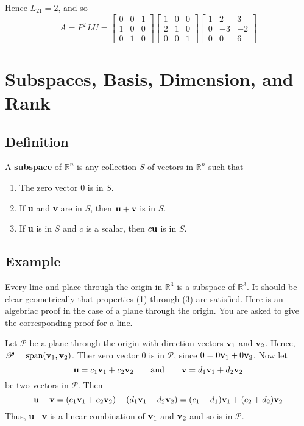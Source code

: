 Hence $L_{21}=2$, and so
\[
    A=P^TLU=\begin{bmatrix}
        0 & 0 & 1 \\
        1 & 0 & 0 \\
        0 & 1 & 0
    \end{bmatrix}\begin{bmatrix}
        1 & 0 & 0 \\
        2 & 1 & 0 \\
        0 & 0 & 1
    \end{bmatrix}\begin{bmatrix}
        1 & 2  & 3  \\
        0 & -3 & -2 \\
        0 & 0  & 6
    \end{bmatrix}
\]

\section{Subspaces, Basis, Dimension, and Rank}

\subsection*{Definition}
A \textbf{subspace} of $\mathbb{R}^n$ is any collection $S$ of vectors in
$\mathbb{R}^n$ such that
\begin{enumerate}[1.]
    \item The zero vector 0 is in $S$.
    \item If \textbf{u} and \textbf{v} are in $S$, then $\mathbf{u+v}$ is in $S$.
    \item If \textbf{u} is in $S$ and $c$ is a scalar, then $c\mathbf{u}$ is in $S$.
\end{enumerate}

\subsection*{Example}
Every line and place through the origin in $\mathbb{R}^3$ is a subspace of $\mathbb{R}^3$.
It should be clear geometrically that properties (1) through (3) are satisfied. Here
is an algebriac proof in the case of a plane through the origin. You are asked to give
the corresponding proof for a line.

Let $\mathscr{P}$ be a plane through the origin with direction vectors $\mathbf{v}_1$ and
$\mathbf{v}_2$. Hence, $\mathscr{P}=\text{span}(\mathbf{v}_1,\mathbf{v}_2)$. Ther zero vector 0 is in
$\mathscr{P}$, since $0=0\mathbf{v}_1+0\mathbf{v}_2$. Now let
\[\mathbf{u}=c_1\mathbf{v}_1+c_2\mathbf{v}_2 \qquad \text{and} \qquad \mathbf{v}=d_1\mathbf{v}_1+d_2\mathbf{v}_2\]
be two vectors in $\mathscr{P}$. Then
\[\mathbf{u+v}=(c_1\mathbf{v}_1+c_2\mathbf{v}_2)+(d_1\mathbf{v}_1+d_2\mathbf{v}_2)=(c_1+d_1)\mathbf{v}_1+(c_2+d_2)\mathbf{v}_2\]
Thus, \textbf{u+v} is a linear combination of $\mathbf{v}_1$ and $\mathbf{v}_2$ and so is in $\mathscr{P}$.

